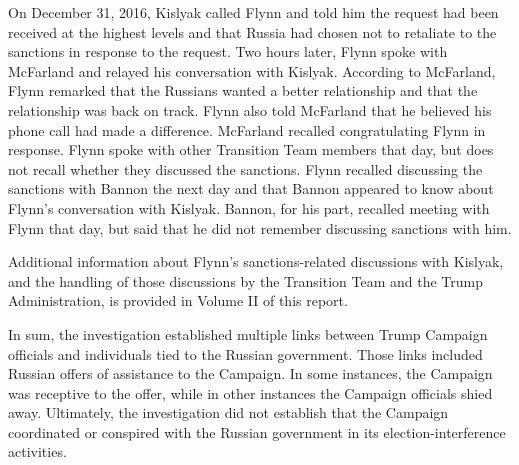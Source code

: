 On December 31, 2016, Kislyak called Flynn and told him the request had been received at the highest levels and that Russia had chosen not to retaliate to the sanctions in response to the request.%
Two hours later, Flynn spoke with McFarland and relayed his conversation with Kislyak.%
According to McFarland, Flynn remarked that the Russians wanted a better relationship and that the relationship was back on track.%
Flynn also told McFarland that he believed his phone call had made a difference.%
McFarland recalled congratulating Flynn in response.%
Flynn spoke with other Transition Team members that day, but does not recall whether they discussed the sanctions.%
Flynn recalled discussing the sanctions with Bannon the next day and that Bannon appeared to know about Flynn's conversation with Kislyak.%
Bannon, for his part, recalled meeting with Flynn that day, but said that he did not remember discussing sanctions with him.%

Additional information about Flynn's sanctions-related discussions with Kislyak, and the handling of those discussions by the Transition Team and the Trump Administration, is provided in Volume II of this report.

\hr

In sum, the investigation established multiple links between Trump Campaign officials and individuals tied to the Russian government.
Those links included Russian offers of assistance to the Campaign.
In some instances, the Campaign was receptive to the offer, while in other instances the Campaign officials shied away.
Ultimately, the investigation did not establish that the Campaign coordinated or conspired with the Russian government in its election-interference activities.
